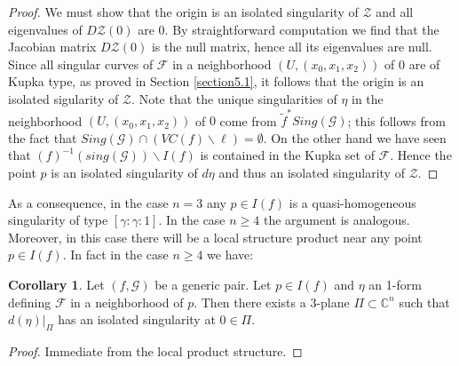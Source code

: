 \documentclass{amsart}
\theoremstyle{definition}
\theoremstyle{proposition}
\newtheorem{cor}[theorem]{Corollary}
\numberwithin{equation}{section}
\theoremstyle{main}
\begin{document}
\begin{proof}
We must show that the origin is an isolated singularity of $\mathcal Z$ and all eigenvalues of $D\mathcal Z(0)$ are $0$. By straightforward computation we find that the Jacobian matrix $D\mathcal Z(0)$ is the null matrix, hence all its eigenvalues are null. Since all singular curves of $\mathcal F$ in a neighborhood $(U,(x_0,x_1,x_2))$ of $0$ are of Kupka type, as proved in Section \ref{section5.1}, it follows that the origin is an isolated sigularity of $\mathcal Z$. Note that the unique singularities of $\eta$ in the neighborhood $(U,(x_0,x_1,x_2))$ of $0$ come from $\tilde f^\ast Sing(\mathcal G)$; this follows from the fact that  $Sing\left(\mathcal G\right) \cap (VC(f) \backslash \ell)= \emptyset$.
  On the other hand we have seen that $(f)^{-1}(sing(\mathcal G))\backslash I(f)$ is contained in the Kupka set of $\mathcal{F}$. Hence the point $p$  is an isolated singularity of $d\eta$ and thus an isolated singularity of $\mathcal Z$.
 \end{proof} 
 
 As a consequence, in the case $n=3$ any $p\in I(f)$ is a quasi-homogeneous singularity of type $\left [{\gamma}:{\gamma}:1\right ]$. In the case $n\geq4$ the argument is analogous. Moreover, in this case there will be a local structure product near any point $p\in I(f)$. In fact in the case $n\geq4$ we have:
\begin{cor} Let $(f,\mathcal G)$ be a generic pair. Let $p \in I(f)$ and $\eta$ an 1-form defining $\mathcal F$ in a neighborhood of $p$. Then there exists a 3-plane $\Pi \subset  \mathbb C^{n}$ such that $d(\eta)|_{\Pi}$ has an isolated singularity at $0 \in{\Pi}. $
\end{cor}
\begin{proof} Immediate from the local product structure.
\end{proof}
\end{document}
